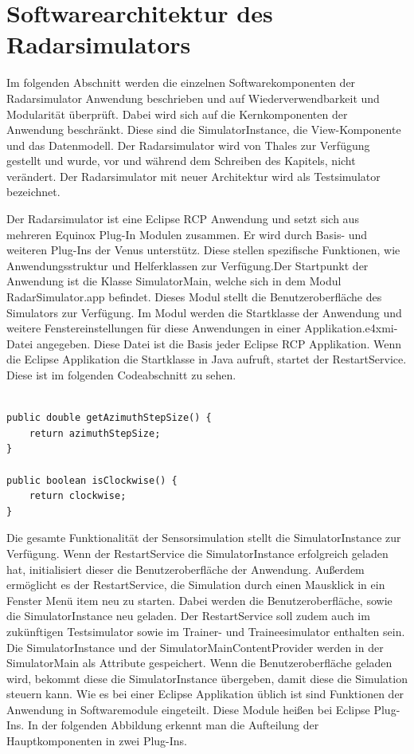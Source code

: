 \section{Softwarearchitektur des Radarsimulators}

Im folgenden Abschnitt werden die einzelnen Softwarekomponenten der Radarsimulator Anwendung beschrieben und auf Wiederverwendbarkeit und Modularität überprüft. Dabei wird sich auf die Kernkomponenten der Anwendung beschränkt. Diese sind die SimulatorInstance, die View-Komponente und das Datenmodell. Der Radarsimulator wird von Thales zur Verfügung gestellt und wurde, vor und während dem Schreiben des Kapitels, nicht verändert. Der Radarsimulator mit neuer Architektur wird als Testsimulator bezeichnet.

Der Radarsimulator ist eine Eclipse RCP Anwendung und setzt sich aus mehreren Equinox Plug-In Modulen zusammen. Er wird durch Basis- und weiteren
Plug-Ins der Venus unterstütz. Diese stellen spezifische Funktionen, wie Anwendungsstruktur und Helferklassen zur Verfügung.Der Startpunkt der Anwendung 
ist die Klasse SimulatorMain, welche sich in dem Modul RadarSimulator.app befindet. Dieses Modul stellt die Benutzeroberfläche des Simulators zur 
Verfügung. Im Modul werden die Startklasse der Anwendung und weitere Fenstereinstellungen für diese Anwendungen in einer Applikation.e4xmi-Datei 
angegeben. Diese Datei ist die Basis jeder Eclipse RCP Applikation. Wenn die Eclipse Applikation die Startklasse in Java aufruft, startet der 
RestartService. Diese ist im folgenden Codeabschnitt zu sehen.

\begin{lstlisting}

public double getAzimuthStepSize() {
	return azimuthStepSize;
}

public boolean isClockwise() {
	return clockwise;
}

\end{lstlisting}

Die gesamte Funktionalität der Sensorsimulation stellt die SimulatorInstance zur Verfügung. Wenn der RestartService die SimulatorInstance erfolgreich geladen hat, initialisiert dieser die Benutzeroberfläche der Anwendung. Außerdem ermöglicht es der RestartService, die Simulation durch einen Mausklick in ein Fenster Menü item neu zu starten. Dabei werden die Benutzeroberfläche, sowie die SimulatorInstance neu geladen. Der RestartService soll zudem auch im zukünftigen Testsimulator sowie im Trainer- und Traineesimulator enthalten sein. Die SimulatorInstance und der SimulatorMainContentProvider werden in der SimulatorMain als Attribute gespeichert. Wenn die Benutzeroberfläche geladen wird, bekommt diese die SimulatorInstance übergeben, damit diese die Simulation steuern kann. Wie es bei einer Eclipse Applikation üblich ist sind Funktionen der Anwendung in Softwaremodule eingeteilt. Diese Module heißen bei Eclipse Plug-Ins. In der folgenden Abbildung erkennt man die Aufteilung der Hauptkomponenten in zwei Plug-Ins.

